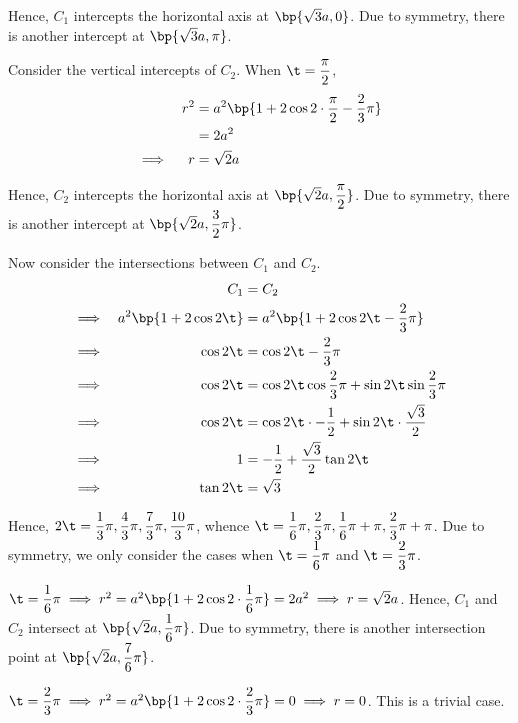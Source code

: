 \documentclass{echw}
\begin{document}
            Hence, $C_1$ intercepts the horizontal axis at $\bp{\sqrt3a, 0}$. Due to symmetry, there is another intercept at $\bp{\sqrt3a, \pi}$.

            Consider the vertical intercepts of $C_2$. When $\t = \dfrac\pi2$,
            \begin{alignat*}{2}
                &&r^2 &= a^2 \bp{1 + 2\cos{2\cdot\dfrac\pi2 - \dfrac23 \pi }}\\
                && &= 2a^2\\
                \implies&&r &= \sqrt2a
            \end{alignat*}

            Hence, $C_2$ intercepts the horizontal axis at $\bp{\sqrt2a, \dfrac\pi2}$. Due to symmetry, there is another intercept at $\bp{\sqrt2a, \dfrac32 \pi}$.

            Now consider the intersections between $C_1$ and $C_2$.
            \begin{alignat*}{2}
                &&C_1 &= C_2\\
                \implies&&a^2\bp{1 + 2\cos2\t} &= a^2 \bp{1 + 2\cos{2\t - \dfrac23 \pi }}\\
                \implies&&\cos2\t &= \cos{2\t - \dfrac23 \pi }\\
                \implies&&\cos2\t &= \cos2\t\cos\dfrac23\pi + \sin2\t\sin\dfrac23\pi\\
                \implies&&\cos2\t &= \cos2\t\cdot-\dfrac12 + \sin2\t\cdot\dfrac{\sqrt3}2\\
                \implies&&1 &= -\dfrac12 + \dfrac{\sqrt3}2\tan2\t\\
                \implies&&\tan2\t &= \sqrt3
            \end{alignat*}

            Hence, $2\t = \dfrac13\pi, \dfrac43\pi, \dfrac73\pi,\dfrac{10}3\pi$, whence $\t = \dfrac16\pi, \dfrac23\pi, \dfrac16\pi + \pi, \dfrac23\pi + \pi$. Due to symmetry, we only consider the cases when $\t = \dfrac16\pi$ and $\t = \dfrac23\pi$.

             $\t = \dfrac16\pi \implies r^2 = a^2 \bp{1 + 2\cos 2\cdot\dfrac16\pi} = 2a^2 \implies r = \sqrt2a$. Hence, $C_1$ and $C_2$ intersect at $\bp{\sqrt2a, \dfrac16 \pi}$. Due to symmetry, there is another intersection point at $\bp{\sqrt2a, \dfrac76 \pi}$.

             $\t = \dfrac23\pi \implies r^2 = a^2 \bp{1 + 2\cos 2\cdot\dfrac23\pi} = 0
            \implies r = 0$. This is a trivial case.
\end{document}
